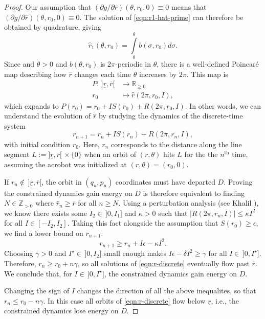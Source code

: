 \documentclass[journal,twoside,web, onecolumn, draftcls]{ieeecolor}
\begin{document}
\begin{proof}
    Our assumption that \((\partial g/\partial r)(\theta,r_0,0) \equiv 0\)
    means that \((\partial g/\partial \hat{r})(\theta,r_0,0) \equiv 0\).
    The solution of \eqref{eqn:r1-hat-prime} can therefore be obtained by
    quadrature, giving
    \[
        \hat{r}_1(\theta,r_0) = \int\limits_0^\theta b(\sigma,r_0)d\sigma
        .
    \]
    Since and \(\dot{\theta} > 0\) and \(b(\theta,r_0)\) is \(2\pi\)-periodic in
    \(\theta\), there is a well-defined Poincar\'{e} map describing
    how \(\hat{r}\) changes each time \(\theta\) increases by \(2\pi\).
    This map is 
    \begin{align}\label{eqn:poincare-map}
        P : \, ]\underline{r},\overline{r}[ &\to \mathbb{R}_{\geq 0} \\
        r_0 &\mapsto \hat{r}(2\pi,r_0,I)
        ,
    \end{align}
    which expands to \(P(r_0) = r_0 + IS(r_0) + R(2\pi,r_0,I)\).
    In other words, we can understand the evolution of \(\hat{r}\) by studying
    the dynamics of the discrete-time system
    \begin{equation}\label{eqn:r-discrete}
        r_{n+1} = r_n + IS(r_n) + R(2\pi,r_n,I)
        ,
    \end{equation}
    with initial condition \(r_0\).
    Here, \(r_n\) corresponds to the distance along the line segment
    \(L := ]\underline{r},\overline{r}[ \, \times \{0\}\)
    when an orbit of \((r,\theta)\) hits \(L\) for the the \(n^\text{th}\) time,
    assuming the acrobot was initialized at \((r,\theta) = (r_0,0)\).

    If \(r_n \not\in \, ]\underline{r},\overline{r}[\), the orbit 
    in \((q_u,p_u)\) coordinates must have
    departed \(D\). %
    Proving the constrained dynamics gain energy on \(D\) is therefore
    equivalent to finding \(N \in \mathbb{Z}_{> 0}\) where 
    \(\hat{r}_{n} \geq \overline{r}\) for all \(n \geq N\).
    Using a perturbation analysis (see Khalil 
    \cite[Theorem 10.1]{khalil_nonlinear}),
    we know there exists some \(I_2 \in \, ]0,I_1]\) and \(\kappa > 0\)
    such that \(\left|R(2\pi,r_n,I)\right| \leq \kappa I^2\) for all 
    \(I \in [-I_2,I_2]\).
    Taking this fact alongside the assumption that \(S(r_0) \geq \epsilon\),
    we find a lower bound on \(r_{n+1}\):
    \[
        r_{n+1} \geq r_n + I\epsilon - \kappa I^2
        .
    \]
    Choosing \(\gamma > 0\) and \(I^\star \in \, ]0,I_2]\) small enough makes 
    \(I\epsilon - \delta I^2 \geq \gamma\) for all \(I \in \, ]0,I^\star]\).
    Therefore, \(r_{n} \geq r_0 + n\gamma\), 
    so all solutions of \eqref{eqn:r-discrete} eventually flow past
    \(\overline{r}\).
    We conclude that, for \(I \in \, ]0, I^\star]\), the constrained dynamics gain
    energy on \(D\).

    Changing the sign of \(I\) changes the direction of all the
    above inequalites, so that \(r_{n} \leq r_0 - n\gamma\). 
    In this case all orbits of \eqref{eqn:r-discrete} flow below
    \(\underline{r}\), i.e., the constrained dynamics lose energy on \(D\).
\end{proof}
\end{document}
